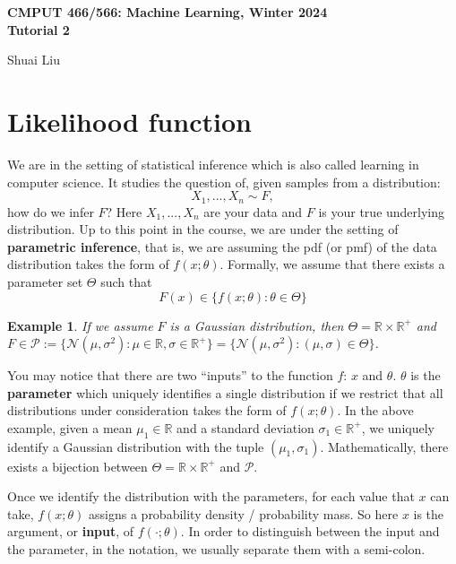 \documentclass{article}
\newtheorem{example}{Example}
\newcommand{\R}{\mathbb{R}}
\DeclareMathOperator*{\1}{\mathbbm{1}}
\newcommand{\cN}{\mathcal{N}}
\theoremstyle{definition}
\theoremstyle{remark}
\begin{document}
\begin{center}
  {\Large \textbf{CMPUT 466/566: Machine Learning, Winter 2024\\ Tutorial 2}}
  \end{center}
  \begin{center}
    Shuai Liu
  \end{center}
  \section{Likelihood function}
  We are in the setting of statistical inference which is also called learning in computer science. It studies the question of, given samples from a distribution:
  \[X_1,...,X_n \sim F,\]
  how do we infer $F$? Here $X_1,...,X_n$ are your data and $F$ is your true underlying distribution. Up to this point in the course, we are under the setting of \textbf{parametric inference}, that is, we are assuming the pdf (or pmf) of the data distribution takes the form of $f(x;\theta)$. Formally, we assume that there exists a parameter set $\Theta$ such that
  \[F(x)\in \{f(x;\theta):\theta\in \Theta\}\]
  \begin{example}
    If we assume $F$ is a Gaussian distribution, then $\Theta=\mathbb R\times \R^+$ and $F\in \mathcal P:=\{\cN(\mu,\sigma^2):\mu\in \R, \sigma\in \R^+\}=\{\cN(\mu,\sigma^2):(\mu, \sigma)\in \Theta\}$.
  \end{example}
  You may notice that there are two “inputs” to the function $f$: $x$ and $\theta$. $\theta$ is the \textbf{parameter} which uniquely identifies a single distribution if we restrict that all distributions under consideration takes the form of $f(x;\theta)$. In the above example, given a mean $\mu_1\in \R$ and a standard deviation $\sigma_1\in \R^+$, we uniquely identify a Gaussian distribution with the tuple $(\mu_1,\sigma_1)$. Mathematically, there exists a bijection between $\Theta=\R\times\R^+$ and $\mathcal P$. 

  Once we identify the distribution with the parameters, for each value that $x$ can take, $f(x;\theta)$ assigns a probability density / probability mass. So here $x$ is the argument, or \textbf{input}, of $f(\cdot; \theta)$. In order to distinguish between the input and the parameter, in the notation, we usually separate them with a semi-colon. 
\end{document}
